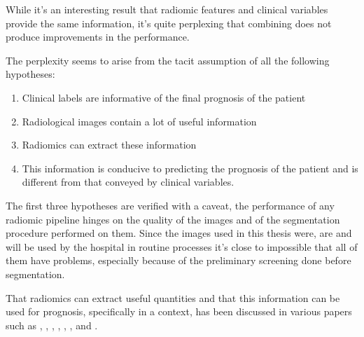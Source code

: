 
While it's an interesting result that radiomic features and clinical variables provide the same information, it's quite perplexing that combining does not produce improvements in the performance.

The perplexity seems to arise from the tacit assumption of all the following hypotheses:

\begin{enumerate}
\item Clinical labels are informative of the final prognosis of the patient
\item Radiological images contain a lot of useful information
\item Radiomics can extract these information
\item This information is conducive to predicting the prognosis of the patient and is different from that conveyed by clinical variables.
\end{enumerate}

The first three hypotheses are verified with a caveat, the performance of any radiomic pipeline hinges on the quality of the images and of the segmentation procedure performed on them. Since the images used in this thesis were, are and will be used by the hospital in routine processes it's close to impossible that all of them have problems, especially because of the preliminary screening done before segmentation.

That radiomics can extract useful quantities and that this information can be used for prognosis, specifically in a \covid context, has been discussed in various papers such as \cite{radscore}, \cite{discrimInfluenza}, \cite{Severity}, \cite{MLcovid}, \cite{MLprognostic}, \cite{severityassessment}, \cite{covidscreening} and \cite{accuratediagnosis}.

